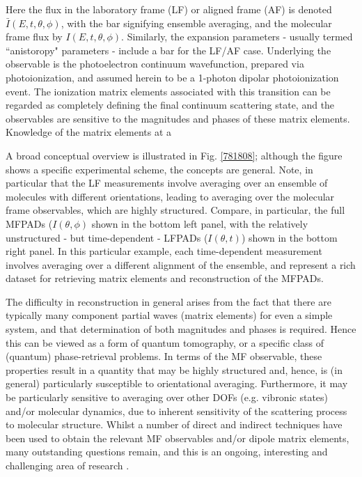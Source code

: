 Here the flux in the laboratory frame (LF) or aligned frame (AF) is denoted $\bar{I}(E,t,\theta,\phi)$, with the bar signifying ensemble averaging, and the molecular frame flux by $I(E,t,\theta,\phi)$. Similarly, the expansion parameters - usually termed ``anistoropy" parameters - include a bar for the LF/AF case. Underlying the observable is the photoelectron continuum wavefunction, prepared via photoionization, and assumed herein to be a 1-photon dipolar photoionization event. The ionization matrix elements associated with this transition can be regarded as completely defining the final continuum scattering state, and the observables are sensitive to the magnitudes and phases of these matrix elements. Knowledge of the matrix elements at a 


A broad conceptual overview is illustrated in Fig. \ref{781808}; although the figure shows a specific experimental scheme, the concepts are general. Note, in particular that the LF measurements involve averaging over an ensemble of molecules with different orientations, leading to averaging over the molecular frame observables, which are highly structured. Compare, in particular, the full MFPADs ($I(\theta,\phi)$ shown in the bottom left panel, with the relatively unstructured - but time-dependent - LFPADs ($I(\theta,t)$) shown in the bottom right panel. In this particular example, each time-dependent measurement involves averaging over a different alignment of the ensemble, and represent a rich dataset for retrieving matrix elements and reconstruction of the MFPADs.

The difficulty in reconstruction in general arises from the fact that there are typically many component partial waves (matrix elements) for even a simple system, and that determination of both magnitudes and phases is required. Hence this can be viewed as a form of quantum tomography, or a specific class of (quantum) phase-retrieval problems. In terms of the MF observable, these properties result in a quantity that may be highly structured and, hence, is (in general) particularly susceptible to orientational averaging. Furthermore, it may be particularly sensitive to averaging over other DOFs (e.g. vibronic states) and/or molecular dynamics, due to inherent sensitivity of the scattering process to molecular structure. Whilst a number of direct and indirect techniques have been used to obtain the relevant MF observables and/or dipole matrix elements, many outstanding questions remain, and this is an ongoing, interesting and challenging area of research \cite{hockett2018QuantumMetrologyPhotoelectrons,hockett2018QuantumMetrologyPhotoelectronsa}.

